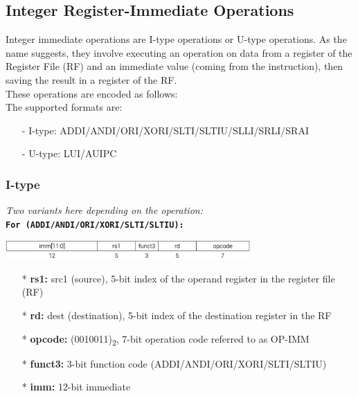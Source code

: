 \documentclass[12pt,openany]{book}
\begin{document}
\subsection{Integer Register-Immediate Operations}
Integer immediate operations are I-type operations or U-type operations. As the name suggests, they involve executing an operation on data from a register of the Register File (RF) and an immediate value (coming from the instruction), then saving the result in a register of the RF.\\

These operations are encoded as follows: \\
The supported formats are: \\
\begin{itemize}
	\item[-] I-type: ADDI/ANDI/ORI/XORI/SLTI/SLTIU/SLLI/SRLI/SRAI
    \item[-] U-type: LUI/AUIPC
\end{itemize}
\newpage
\subsubsection{I-type}
\textit{Two variants here depending on the operation:}\\
\texttt{\textbf{For (ADDI/ANDI/ORI/XORI/SLTI/SLTIU):}}\\
\begin{center}
	\includegraphics[width=0.7\textwidth]{circuits/20.1.2_3.png}
\end{center}
\begin{itemize}
    \item[*] \textbf{rs1:} src1 (source), 5-bit index of the operand register in the register file (RF)
    \item[*] \textbf{rd:} dest (destination), 5-bit index of the destination register in the RF
    \item[*] \textbf{opcode:} (0010011)\textsubscript{2}, 7-bit operation code referred to as OP-IMM
    \item[*] \textbf{funct3:} 3-bit function code (ADDI/ANDI/ORI/XORI/SLTI/SLTIU)
    \item[*] \textbf{imm:} 12-bit immediate
\end{itemize}
\end{document}
